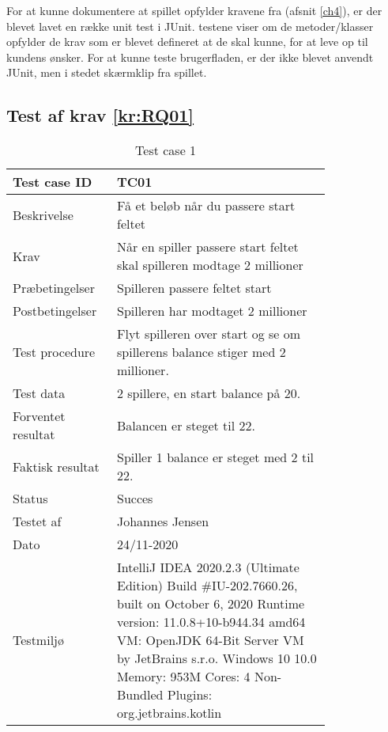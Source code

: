 For at kunne dokumentere at spillet opfylder kravene fra (afsnit \ref{ch4}), er der blevet lavet en række unit test i JUnit. testene viser om de metoder/klasser opfylder de krav som er blevet defineret at de skal kunne, for at leve op til kundens ønsker. For at kunne teste brugerfladen, er der ikke blevet anvendt JUnit, men i stedet skærmklip fra spillet. 

\subsection{Test af krav \ref{kr:RQ01}}

\begin{table}[h]
    \centering
    \begin{tabular}{|p{0.20\linewidth} | p{0.6\linewidth}|}
    \hline
        Test case ID & TC01 \\
        \hline
        Beskrivelse & Få et beløb når du passere start feltet \\
        \hline
        Krav & Når en spiller passere start feltet skal spilleren modtage 2 millioner\\
        \hline
        Præbetingelser & Spilleren passere feltet start \\
        \hline
        Postbetingelser & Spilleren har modtaget 2 millioner \\
        \hline
        Test procedure & Flyt spilleren over start og se om spillerens balance stiger med 2 millioner.\\
        \hline
        Test data & 2 spillere, en start balance på 20. \\
        \hline
        Forventet resultat & Balancen er steget til 22. \\
        \hline
        Faktisk resultat & Spiller 1 balance er steget med 2 til 22. \\
        \hline
        Status & Succes\\
        \hline
        Testet af & Johannes Jensen \\
        \hline
        Dato & 24/11-2020 \\
        \hline
        Testmiljø & IntelliJ IDEA 2020.2.3 (Ultimate Edition)
Build \#IU-202.7660.26, built on October 6, 2020
Runtime version: 11.0.8+10-b944.34 amd64
VM: OpenJDK 64-Bit Server VM by JetBrains s.r.o.
Windows 10 10.0
Memory: 953M
Cores: 4
Non-Bundled Plugins: org.jetbrains.kotlin\\
        \hline
    \end{tabular}
    \caption{Test case 1}
    \label{tab:TC01}
\end{table}

